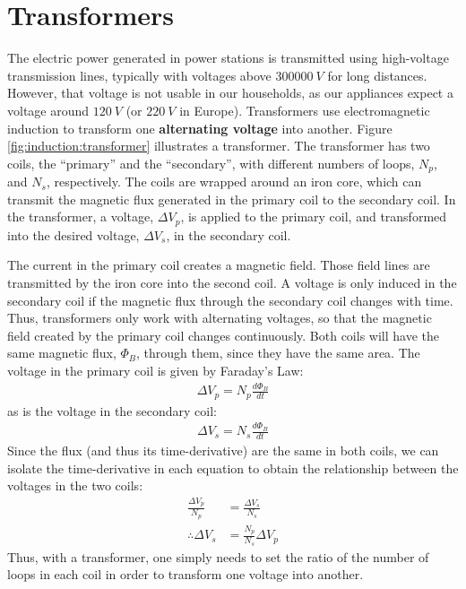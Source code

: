 \section{Transformers}
The electric power generated in power stations is transmitted using high-voltage transmission lines, typically with voltages above $\SI{300000}{V}$ for long distances. However, that voltage is not usable in our households, as our appliances expect a voltage around $\SI{120}{V}$ (or $\SI{220}{V}$ in Europe). Transformers use electromagnetic induction to transform one \textbf{alternating voltage} into another. Figure \ref{fig:induction:transformer} illustrates a transformer.
The transformer has two coils, the ``primary'' and the ``secondary'', with different numbers of loops, $N_p$, and $N_s$, respectively. The coils are wrapped around an iron core, which can transmit the magnetic flux generated in the primary coil to the secondary coil. In the transformer, a voltage, $\Delta V_p$, is applied to the primary coil, and transformed into the desired voltage, $\Delta V_s$, in the secondary coil. 

The current in the primary coil creates a magnetic field. Those field lines are transmitted by the iron core into the second coil. A voltage is only induced in the secondary coil if the magnetic flux through the secondary coil changes with time. Thus, transformers only work with alternating voltages, so that the magnetic field created by the primary coil changes continuously. Both coils will have the same magnetic flux, $\Phi_B$, through them, since they have the same area. The voltage in the primary coil is given by Faraday's Law:
\begin{align*}
\Delta V_p = N_p \frac{d\Phi_B}{dt}
\end{align*}
as is the voltage in the secondary coil:
\begin{align*}
\Delta V_s = N_s \frac{d\Phi_B}{dt}
\end{align*}
Since the flux (and thus its time-derivative) are the same in both coils, we can isolate the time-derivative in each equation to obtain the relationship between the voltages in the two coils:
\begin{align*}
\frac{\Delta V_p}{N_p}&=\frac{\Delta V_s}{N_s}\\
\therefore \Delta V_s &= \frac{N_p}{N_s}\Delta V_p
\end{align*}
Thus, with a transformer, one simply needs to set the ratio of the number of loops in each coil in order to transform one voltage into another.

